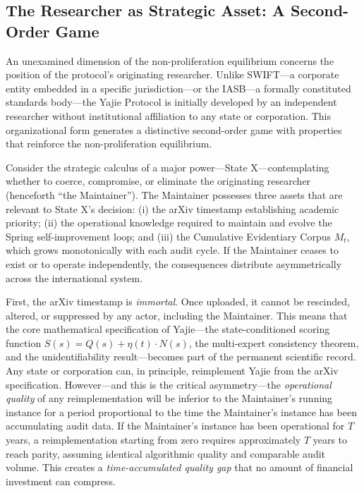 \documentclass[12pt,a4paper]{article}
\theoremstyle{definition}
\theoremstyle{remark}
\begin{document}
\subsection{The Researcher as Strategic Asset: A Second-Order Game}

An unexamined dimension of the non-proliferation equilibrium concerns the position of the protocol's originating researcher. Unlike SWIFT—a corporate entity embedded in a specific jurisdiction—or the IASB—a formally constituted standards body—the Yajie Protocol is initially developed by an independent researcher without institutional affiliation to any state or corporation. This organizational form generates a distinctive second-order game with properties that reinforce the non-proliferation equilibrium.

Consider the strategic calculus of a major power—State X—contemplating whether to coerce, compromise, or eliminate the originating researcher (henceforth ``the Maintainer''). The Maintainer possesses three assets that are relevant to State X's decision: (i) the arXiv timestamp establishing academic priority; (ii) the operational knowledge required to maintain and evolve the Spring self-improvement loop; and (iii) the Cumulative Evidentiary Corpus $M_t$, which grows monotonically with each audit cycle. If the Maintainer ceases to exist or to operate independently, the consequences distribute asymmetrically across the international system.

First, the arXiv timestamp is \textit{immortal}. Once uploaded, it cannot be rescinded, altered, or suppressed by any actor, including the Maintainer. This means that the core mathematical specification of Yajie—the state-conditioned scoring function $S(s) = Q(s) + \eta(t)\cdot N(s)$, the multi-expert consistency theorem, and the unidentifiability result—becomes part of the permanent scientific record. Any state or corporation can, in principle, reimplement Yajie from the arXiv specification. However—and this is the critical asymmetry—the \textit{operational quality} of any reimplementation will be inferior to the Maintainer's running instance for a period proportional to the time the Maintainer's instance has been accumulating audit data. If the Maintainer's instance has been operational for $T$ years, a reimplementation starting from zero requires approximately $T$ years to reach parity, assuming identical algorithmic quality and comparable audit volume. This creates a \textit{time-accumulated quality gap} that no amount of financial investment can compress.
\end{document}
